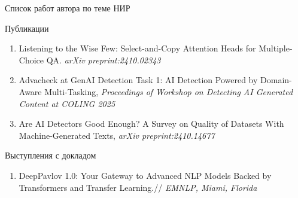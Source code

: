 \documentclass{beamer}
\begin{document}
\begin{frame}{Список работ автора по теме НИР}
        \begin{block}{Публикации}
        \begin{enumerate}
            \item Listening to the Wise Few: Select-and-Copy Attention Heads for Multiple-Choice QA. \textit{arXiv preprint:2410.02343}
            \item Advacheck at GenAI Detection Task 1: AI Detection Powered by Domain-Aware Multi-Tasking, \textit{Proceedings of Workshop on Detecting AI Generated Content at COLING 2025}
            \item  Are AI Detectors Good Enough? A Survey on Quality of Datasets With Machine-Generated Texts, \textit{arXiv preprint:2410.14677}
        \end{enumerate}
    \end{block}
    \begin{block}{Выступления с докладом}
        \begin{enumerate}
            \item DeepPavlov 1.0: Your Gateway to Advanced NLP Models Backed by Transformers and Transfer Learning.// \textit{EMNLP, Miami, Florida}
        \end{enumerate}
    \end{block}
\end{frame}
\end{document}
